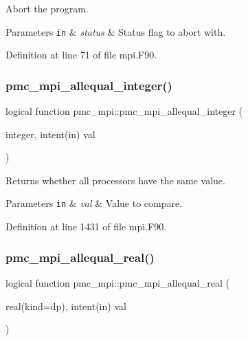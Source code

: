 Abort the program. 


\begin{DoxyParams}[1]{Parameters}
\mbox{\tt in}  & {\em status} & Status flag to abort with. \\
\hline
\end{DoxyParams}


Definition at line 71 of file mpi.\+F90.

\mbox{\label{namespacepmc__mpi_aa5850392ee2226b1d9b0387849d33b42}} 
\subsubsection{\texorpdfstring{pmc\+\_\+mpi\+\_\+allequal\+\_\+integer()}{pmc\_mpi\_allequal\_integer()}}
{\footnotesize\ttfamily logical function pmc\+\_\+mpi\+::pmc\+\_\+mpi\+\_\+allequal\+\_\+integer (\begin{DoxyParamCaption}\item[{integer, intent(in)}]{val }\end{DoxyParamCaption})}



Returns whether all processors have the same value. 


\begin{DoxyParams}[1]{Parameters}
\mbox{\tt in}  & {\em val} & Value to compare. \\
\hline
\end{DoxyParams}


Definition at line 1431 of file mpi.\+F90.

\mbox{\label{namespacepmc__mpi_a92d80c63cf20c10ce32e2e8e5cb81c18}} 
\subsubsection{\texorpdfstring{pmc\+\_\+mpi\+\_\+allequal\+\_\+real()}{pmc\_mpi\_allequal\_real()}}
{\footnotesize\ttfamily logical function pmc\+\_\+mpi\+::pmc\+\_\+mpi\+\_\+allequal\+\_\+real (\begin{DoxyParamCaption}\item[{real(kind=dp), intent(in)}]{val }\end{DoxyParamCaption})}



